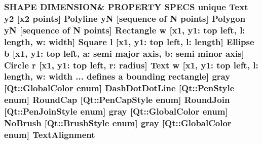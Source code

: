 \subsubsection[{\texorpdfstring{Text\+Alignment}{TextAlignment}}]{\setlength{\rightskip}{0pt plus 5cm}S\+H\+A\+PE D\+I\+M\+E\+N\+S\+I\+ON\& P\+R\+O\+P\+E\+R\+TY S\+P\+E\+CS unique {\bf Text} {\bf y2} \mbox{[}{\bf x2} points\mbox{]} {\bf Polyline} yN \mbox{[}sequence of N points\mbox{]} {\bf Polygon} yN \mbox{[}sequence of N points\mbox{]} {\bf Rectangle} w \mbox{[}{\bf x1}, y1\+: top left, l\+: length, w\+: width\mbox{]} {\bf Square} {\bf l} \mbox{[}{\bf x1}, y1\+: top left, l\+: length\mbox{]} {\bf Ellipse} b \mbox{[}{\bf x1}, y1\+: top left, a\+: semi major axis, b\+: semi minor axis\mbox{]} {\bf Circle} r \mbox{[}{\bf x1}, y1\+: top left, r\+: radius\mbox{]} {\bf Text} w \mbox{[}{\bf x1}, y1\+: top left, l\+: length, w\+: width ... defines {\bf a} bounding rectangle\mbox{]} gray \mbox{[}Qt\+::\+Global\+Color enum\mbox{]} Dash\+Dot\+Dot\+Line \mbox{[}Qt\+::\+Pen\+Style enum\mbox{]} Round\+Cap \mbox{[}{\bf Qt\+::\+Pen\+Cap\+Style} enum\mbox{]} Round\+Join \mbox{[}{\bf Qt\+::\+Pen\+Join\+Style} enum\mbox{]} gray \mbox{[}Qt\+::\+Global\+Color enum\mbox{]} No\+Brush \mbox{[}{\bf Qt\+::\+Brush\+Style} enum\mbox{]} gray \mbox{[}Qt\+::\+Global\+Color enum\mbox{]} Text\+Alignment}\hypertarget{shape__input__file__specs_8txt_a1f13b9fbbcf54ce40d242716deecf3d5}{}\label{shape__input__file__specs_8txt_a1f13b9fbbcf54ce40d242716deecf3d5}
